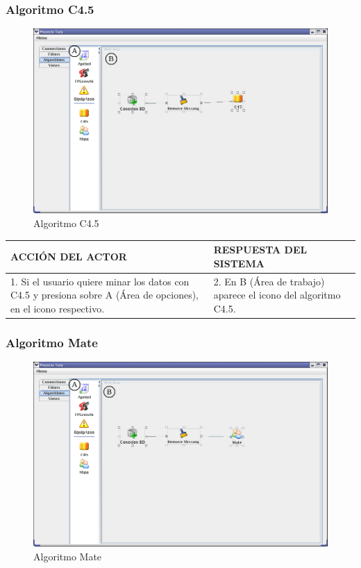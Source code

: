 \subsubsection{Algoritmo C4.5}
\begin{figure}[h]
 \centering
 \includegraphics[width=1\textwidth]{images/a4.png}
 \caption{Algoritmo C4.5}
\end{figure}

\begin{center}
\begin{tabular}{|p{60mm}|p{60mm}|}\hline
ACCI\'ON DEL ACTOR & RESPUESTA DEL SISTEMA \\ \hline
1. Si el usuario quiere minar los datos con C4.5 y presiona sobre A (\'Area de opciones), en el icono respectivo.
& 2. En B (\'Area de trabajo) aparece el icono del algoritmo C4.5. \\ \hline
\end{tabular}
\end{center}
\newpage

\subsubsection{Algoritmo Mate}
\begin{figure}[h]
 \centering
 \includegraphics[width=1\textwidth]{images/a5.png}
 \caption{Algoritmo Mate}
\end{figure}

